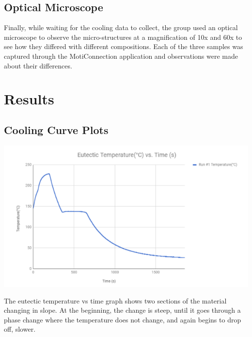 \documentclass{article}
\begin{document}
\subsection{Optical Microscope}
Finally, while waiting for the cooling data to collect, the group used an optical microscope to observe the micro-structures at a magnification of 10x and 60x to see how they differed with different compositions. Each of the three samples was captured through the MotiConnection application and observations were made about their differences. 

\section{Results}
\subsection{Cooling Curve Plots}
\begin{center}
\includegraphics[width=400pt]{Eutectic_Graph.png}
\end{center}
The eutectic temperature vs time graph shows two sections of the material changing in slope. At the beginning, the change is steep, until it goes through a phase change where the temperature does not change, and again begins to drop off, slower.
\end{document}
